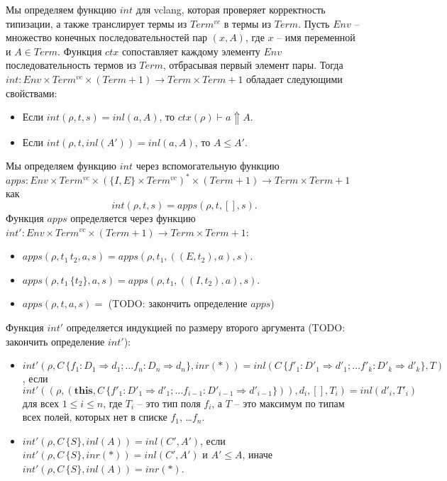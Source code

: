 \documentclass{amsart}
\theoremstyle{definition}
\theoremstyle{remark}
\newcommand{\red}{\Rightarrow}
\numberwithin{figure}{section}
\begin{document}
Мы определяем функцию $int$ для vclang, которая проверяет корректность типизации, а также транслирует термы из $Term^{vc}$ в термы из $Term$.
Пусть $Env$ -- множество конечных последовательностей пар $(x,A)$, где $x$ -- имя переменной и $A \in Term$.
Функция $ctx$ сопоставляет каждому элементу $Env$ последовательность термов из $Term$, отбрасывая первый элемент пары.
Тогда $int : Env \times Term^{vc} \times (Term + 1) \to Term \times Term + 1$ обладает следующими свойствами:
\begin{itemize}
\item Если $int(\rho, t, s) = inl(a, A)$, то $ctx(\rho) \vdash a \Uparrow A$.
\item Если $int(\rho, t, inl(A')) = inl(a, A)$, то $A \leq A'$.
\end{itemize}

Мы определяем функцию $int$ через вспомогательную функцию $apps : Env \times Term^{vc} \times (\{ I, E \} \times Term^{vc})^* \times (Term + 1) \to Term \times Term + 1$ как
\[ int(\rho, t, s) = apps(\rho, t, [], s). \]
Функция $apps$ определяется через функцию $int' : Env \times Term^{vc} \times (Term + 1) \to Term \times Term + 1$:
\begin{itemize}
\item $apps(\rho, t_1\,t_2, a, s) = apps(\rho, t_1, ((E, t_2), a), s)$.
\item $apps(\rho, t_1\,\{t_2\}, a, s) = apps(\rho, t_1, ((I, t_2), a), s)$.
\item $apps(\rho, t, a, s) = $ (TODO: закончить определение $apps$)
\end{itemize}
Функция $int'$ определяется индукцией по размеру второго аргумента (TODO: закончить определение $int'$):
\begin{itemize}
\item $int'(\rho, C\,\{ f_1 : D_1 \red d_1; \ldots f_n : D_n \red d_n \}, inr(*)) = inl(C\,\{ f'_1 : D'_1 \red d'_1; \ldots f'_k : D'_k \red d'_k \}, T)$, если
    $int'((\rho, (\mathbf{this}, C\,\{ f'_1 : D'_1 \red d'_1; \ldots f_{i-1} : D'_{i-1} \red d'_{i-1} \})), d_i, [], T_i) = inl(d'_i, T'_i)$
    для всех $1 \leq i \leq n$, где $T_i$ -- это тип поля $f_i$, а $T$ -- это максимум по типам всех полей, которых нет в списке $f_1$, \ldots $f_n$.
\item $int'(\rho, C\,\{ S \}, inl(A)) = inl(C', A')$, если $int'(\rho, C\,\{ S \}, inr(*)) = inl(C', A')$ и $A' \leq A$, иначе $int'(\rho, C\,\{ S \}, inl(A)) = inr(*)$.
\end{itemize}



\end{document}
